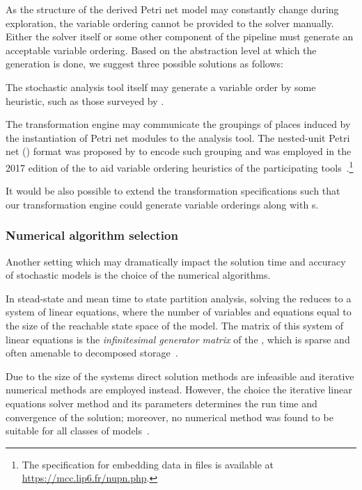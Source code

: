 As the structure of the derived Petri net model may constantly change during exploration, the variable ordering cannot be provided to the solver manually. Either the solver itself or some other component of the  pipeline must generate an acceptable variable ordering. Based on the abstraction level at which the generation is done, we suggest three possible solutions as follows:
\begin{itemize*}
\item The stochastic analysis tool itself may generate a variable order by some heuristic, such as those surveyed by \citet{Amparore17ordering}.
\item The  transformation engine may communicate the groupings of places induced by the instantiation of Petri net modules to the analysis tool. The nested-unit Petri net () format was proposed by \citet{Garavel15nupn} to encode such grouping and was employed in the 2017 edition of the  to aid variable ordering heuristics of the participating tools~\citep{Kordon17mcc}.\footnote{The specification for embedding  data in  files is available at \url{https://mcc.lip6.fr/nupn.php}.}
\item It would be also possible to extend the transformation specifications such that our transformation engine could generate variable orderings along with s.
\end{itemize*}

\subsubsection{Numerical algorithm selection}

Another setting which may dramatically impact the solution time and accuracy of stochastic models is the choice of the numerical algorithms.

In stead-state and mean time to state partition analysis, solving the  reduces to a system of linear equations, where the number of variables and equations equal to the size of the reachable state space of the model. The matrix of this system of linear equations is the \emph{infinitesimal generator matrix} of the , which is sparse and often amenable to decomposed storage~\citep{Buchholz99hierarchical}.

Due to the size of the systems direct solution methods are infeasible and iterative numerical methods are employed instead. However, the choice the iterative linear equations solver method and its parameters determines the run time and convergence of the solution; moreover, no numerical method was found to be suitable for all classes of models~\citep{Buchholz99structured,Marussy16configurable,Buccholz17compact}.

